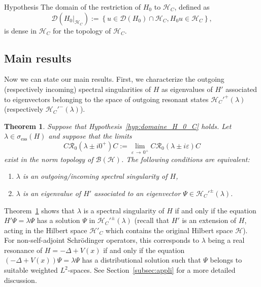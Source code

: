\documentclass[10pt]{amsart}
\newtheorem{theo}{Theorem}[section]
\theoremstyle{definition}\newtheorem{defi}[theo]{Definition}\newtheorem{rema}[theo]{Remark}\newtheorem{exam}[theo]{Example}\newtheorem{exem}[theo]{Example}\newtheorem{nota}[theo]{Notation}
\newcommand{\Hi}{\mathcal{H}}
\newcommand{\ess}{\mathrm{ess}}
\newcommand{\Res}{\mathcal{R}}
\newcommand{\clB}{\mathcal{B}}
\newcommand{\clD}{\mathcal{D}}
\newcommand*{\romanenumi}{\renewcommand*{\theenumi}{\roman{enumi}}}
\begin{document}
\begin{enonce}
{Hypothesis}\label{hyp:domaine_H_0_C}
The domain of the restriction of $H_0$ to $\Hi_C$, defined as
\begin{equation*}
\clD({H_0}|_{\Hi_C}):=\left\lbrace u\in\clD(H_0)\cap\Hi_C, H_0u\in\Hi_C\right\rbrace,
\end{equation*}
is dense in $\Hi_C$ for the topology of $\Hi_C$.
\end{enonce}



\subsection{Main results}


Now we can state our main results. First, we characterize the outgoing (respectively incoming) spectral singularities of $H$ as eigenvalues of $H'$ associated to eigenvectors belonging to the space of outgoing resonant states $\Hi_C'^+(\lambda)$ (respectively $\Hi_C'^-(\lambda)$).

\begin{theo}\label{thm:spec_sing}
Suppose that Hypothesis~\ref{hyp:domaine_H_0_C} holds. Let $\lambda\in \sigma_\ess(H)$ and suppose that the limits
\begin{equation*}
C\Res_0(\lambda \pm i0^+)C:=\lim_{\varepsilon\,\rightarrow\,0^+}C\Res_0(\lambda \pm i\varepsilon)C
\end{equation*}
exist in the norm topology of $\clB(\Hi)$. The following conditions are equivalent:
\begin{enumerate}\romanenumi
\item\label{it:spec_sing}
$\lambda$ is an outgoing/incoming spectral singularity of $H$,
\item\label{it:res_state}
$\lambda$ is an eigenvalue of $H'$ associated to an eigenvector $\Psi\in\Hi_C'^\pm(\lambda)$.
\end{enumerate}
\end{theo}

Theorem~\ref{thm:spec_sing} shows that $\lambda$ is a spectral singularity of $H$ if and only if the equation $H'\Psi=\lambda\Psi$ has a solution $\Psi$ in $\Hi_C'^\pm(\lambda)$ (recall that $H'$ is an extension of $H$, acting in the Hilbert space $\Hi'_C$ which contains the original Hilbert space $\Hi$). For non-self-adjoint Schr\"odinger operators, this corresponds to $\lambda$ being a real resonance of $H=-\Delta+V(x)$ if and only if the equation $(-\Delta+V(x))\Psi=\lambda\Psi$ has a distributional solution such that $\Psi$ belongs to suitable weighted $L^2$-spaces. See Section~\ref{subsec:appli} for a more detailed discussion.
\end{document}
